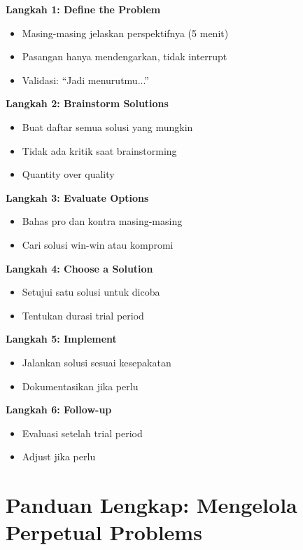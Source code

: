 \begin{praktikbox}
\textbf{Langkah 1: Define the Problem}
\begin{itemize}
    \item Masing-masing jelaskan perspektifnya (5 menit)
    \item Pasangan hanya mendengarkan, tidak interrupt
    \item Validasi: ``Jadi menurutmu...''
\end{itemize}

\textbf{Langkah 2: Brainstorm Solutions}
\begin{itemize}
    \item Buat daftar semua solusi yang mungkin
    \item Tidak ada kritik saat brainstorming
    \item Quantity over quality
\end{itemize}

\textbf{Langkah 3: Evaluate Options}
\begin{itemize}
    \item Bahas pro dan kontra masing-masing
    \item Cari solusi win-win atau kompromi
\end{itemize}

\textbf{Langkah 4: Choose a Solution}
\begin{itemize}
    \item Setujui satu solusi untuk dicoba
    \item Tentukan durasi trial period
\end{itemize}

\textbf{Langkah 5: Implement}
\begin{itemize}
    \item Jalankan solusi sesuai kesepakatan
    \item Dokumentasikan jika perlu
\end{itemize}

\textbf{Langkah 6: Follow-up}
\begin{itemize}
    \item Evaluasi setelah trial period
    \item Adjust jika perlu
\end{itemize}
\end{praktikbox}

\section{Panduan Lengkap: Mengelola Perpetual Problems}

